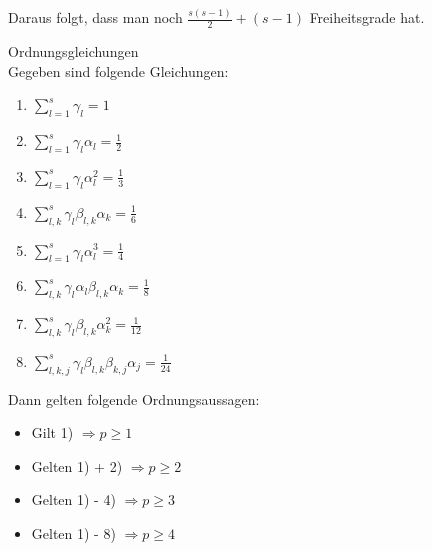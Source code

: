 Daraus folgt, dass man noch $\frac{s(s-1)}{2}+(s-1)$ Freiheitsgrade hat.

\begin{theorem}
	Ordnungsgleichungen
	\\
	Gegeben sind folgende Gleichungen:
	\begin{enumerate}
		\item $\sum_{l=1}^{s}\gamma_{l}=1$
		\item $\sum_{l=1}^{s}\gamma_{l}\alpha_{l}=\frac{1}{2}$
		\item $\sum_{l=1}^{s}\gamma_{l}\alpha_{l}^{2}=\frac{1}{3}$
		\item $\sum_{l,k}^{s}\gamma_{l}\beta_{l,k}\alpha_{k}=\frac{1}{6}$
		\item $\sum_{l=1}^{s}\gamma_{l}\alpha_{l}^{3}=\frac{1}{4}$
		\item $\sum_{l,k}^{s}\gamma_{l}\alpha_{l}\beta_{l,k}\alpha_{k}=\frac{1}{8}$
		\item $\sum_{l,k}^{s}\gamma_{l}\beta_{l,k}\alpha_{k}^{2}=\frac{1}{12}$
		\item $\sum_{l,k,j}^{s}\gamma_{l}\beta_{l,k}\beta_{k,j}\alpha_{j}=\frac{1}{24}$
	\end{enumerate}
	Dann gelten folgende Ordnungsaussagen:
	\begin{itemize}
		\item Gilt 1) $\Rightarrow p\ge 1$
		\item Gelten 1) + 2) $\Rightarrow p\ge 2$
		\item Gelten 1) - 4) $\Rightarrow p\ge 3$
		\item Gelten 1) - 8) $\Rightarrow p \ge 4$
	\end{itemize}
\end{theorem}


